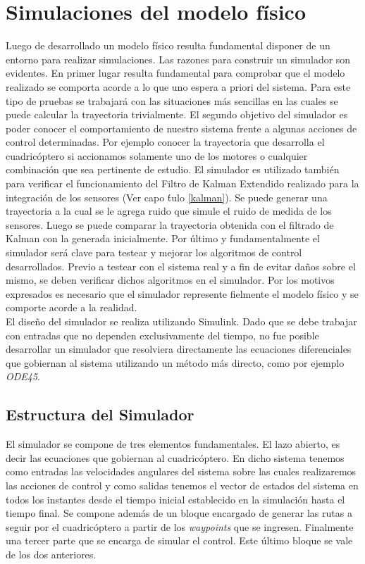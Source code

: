\documentclass[main]{subfiles}
\begin{document}
\chapter{Simulaciones del modelo f\'isico}
\label{chap:simulador}

Luego de desarrollado un modelo f\'isico resulta fundamental disponer de un entorno para realizar simulaciones. Las razones para construir un simulador son evidentes. En primer lugar resulta fundamental para comprobar que el modelo realizado se comporta acorde a lo que uno espera a priori del sistema. Para este tipo de pruebas se trabajar\'a con las situaciones m\'as sencillas en las cuales se puede calcular la trayectoria trivialmente. El segundo objetivo del simulador es poder conocer el comportamiento de nuestro sistema frente a algunas acciones de control determinadas. Por ejemplo conocer la trayectoria que desarrolla el cuadric\'optero si accionamos solamente uno de los motores o cualquier combinaci\'on que sea pertinente de estudio. El simulador es utilizado tambi\'en para verificar el funcionamiento del Filtro de Kalman Extendido realizado para la integraci\'on de los sensores (Ver capo \'tulo \ref{kalman}). Se puede generar una trayectoria a la cual se le agrega ruido que simule el ruido de medida de los sensores. Luego se puede comparar la trayectoria obtenida con el filtrado de Kalman con la generada inicialmente. Por 	\'ultimo y fundamentalmente el simulador ser\'a clave para testear y mejorar los algoritmos de control desarrollados. Previo a testear con el sistema real y a fin de evitar da\~nos sobre el mismo, se deben verificar dichos algoritmos en el simulador. Por los motivos expresados es necesario que el simulador represente fielmente el modelo f\'isico y se comporte acorde a la realidad. \\

El dise\~no del simulador se realiza utilizando Simulink. Dado que se debe trabajar con entradas que no dependen exclusivamente del tiempo, no fue posible desarrollar un simulador que resolviera directamente las ecuaciones diferenciales que gobiernan al sistema utilizando un m\'etodo m\'as directo, como por ejemplo \emph{ODE45}. 



\section{Estructura del Simulador}

El simulador se compone de tres elementos fundamentales. El lazo abierto, es decir las ecuaciones que gobiernan al cuadric\'optero. En dicho sistema tenemos como entradas las velocidades angulares del sistema sobre las cuales realizaremos las acciones de control y como salidas tenemos el vector de estados del sistema en todos los instantes desde el tiempo inicial establecido en la simulaci\'on hasta el tiempo final. Se compone adem\'as de un bloque encargado de generar las rutas a seguir por el cuadric\'optero a partir de los \emph{waypoints} que se ingresen. Finalmente una tercer parte que se encarga de simular el control. Este \'ultimo bloque se vale de los dos anteriores.
\end{document}
